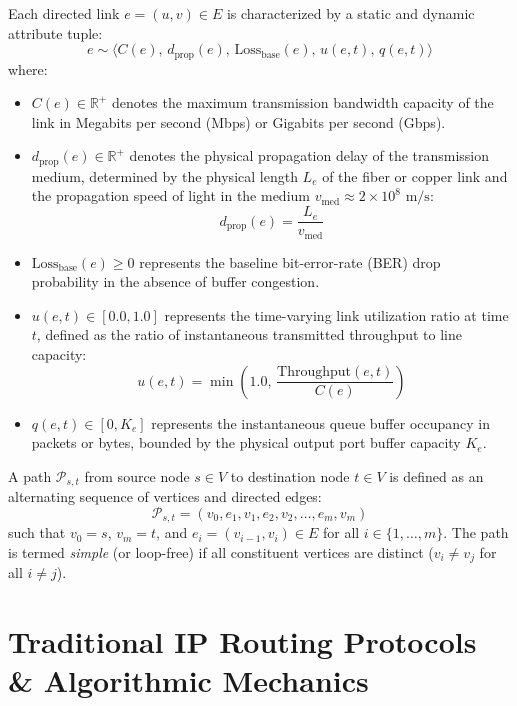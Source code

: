 Each directed link $e = (u, v) \in E$ is characterized by a static and dynamic attribute tuple:
\begin{equation}
    e \sim \langle C(e), \, d_{\text{prop}}(e), \, \text{Loss}_{\text{base}}(e), \, u(e, t), \, q(e, t) \rangle
\end{equation}
where:
\begin{itemize}
    \item $C(e) \in \mathbb{R}^+$ denotes the maximum transmission bandwidth capacity of the link in Megabits per second (Mbps) or Gigabits per second (Gbps).
    \item $d_{\text{prop}}(e) \in \mathbb{R}^+$ denotes the physical propagation delay of the transmission medium, determined by the physical length $L_e$ of the fiber or copper link and the propagation speed of light in the medium $v_{\text{med}} \approx 2 \times 10^8\text{ m/s}$:
    \begin{equation}
        d_{\text{prop}}(e) = \frac{L_e}{v_{\text{med}}}
    \end{equation}
    \item $\text{Loss}_{\text{base}}(e) \ge 0$ represents the baseline bit-error-rate (BER) drop probability in the absence of buffer congestion.
    \item $u(e, t) \in [0.0, 1.0]$ represents the time-varying link utilization ratio at time $t$, defined as the ratio of instantaneous transmitted throughput to line capacity:
    \begin{equation}
        u(e, t) = \min\left(1.0, \, \frac{\text{Throughput}(e, t)}{C(e)}\right)
    \end{equation}
    \item $q(e, t) \in [0, K_e]$ represents the instantaneous queue buffer occupancy in packets or bytes, bounded by the physical output port buffer capacity $K_e$.
\end{itemize}

A path $\mathcal{P}_{s, t}$ from source node $s \in V$ to destination node $t \in V$ is defined as an alternating sequence of vertices and directed edges:
\begin{equation}
    \mathcal{P}_{s, t} = (v_0, e_1, v_1, e_2, v_2, \dots, e_m, v_m)
\end{equation}
such that $v_0 = s$, $v_m = t$, and $e_i = (v_{i-1}, v_i) \in E$ for all $i \in \{1, \dots, m\}$. The path is termed \emph{simple} (or loop-free) if all constituent vertices are distinct ($v_i \ne v_j$ for all $i \ne j$).

\section{Traditional IP Routing Protocols \& Algorithmic Mechanics}

